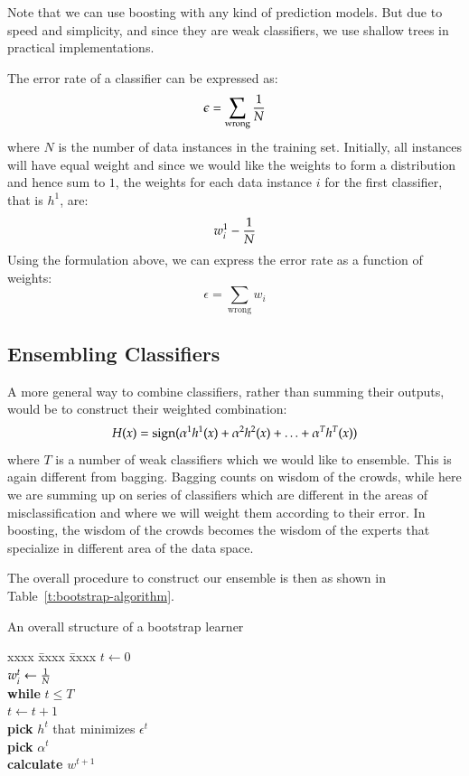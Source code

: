 \begin{refsection}
Note that we can use boosting with any kind of prediction models. But due to speed and simplicity, and since they are weak classifiers, we use shallow trees in practical implementations.

The error rate of a classifier can be expressed as:
$$\epsilon = \sum_\text{wrong}{1\over N}$$
where $N$ is the number of data instances in the training set. Initially, all instances will have equal weight and since we would like the weights to form a distribution and hence sum to $1$, the weights for each data instance $i$ for the first classifier, that is $h^1$, are:
$$w_i^1 - {1\over N}$$
Using the formulation above, we can express the error rate as a function of weights:
$$\epsilon = \sum_{\text{wrong}} w_i$$

\subsection*{Ensembling Classifiers}

A more general way to combine classifiers, rather than summing their outputs, would be to construct their weighted combination:
$$ H(x) = \text{sign}(\alpha^1 h^1(x) + \alpha^2 h^2(x) + \ldots + \alpha^T h^T(x)) $$
where $T$ is a number of weak classifiers which we would like to ensemble. This is again different from bagging. Bagging counts on wisdom of the crowds, while here we are summing up on series of classifiers which are different in the areas of misclassification and where we will weight them according to their error. In boosting, the wisdom of the crowds becomes the wisdom of the experts that specialize in different area of the data space.

The overall procedure to construct our ensemble is then as shown in Table~\ref{t:bootstrap-algorithm}.

\begin{table}
\caption{An overall structure of a bootstrap learner}
\begin{tabbing}
xxxx \= xxxx \= xxxx \kill
$t\leftarrow 0$ \\
$w_i^t\leftarrow {1\over N}$ \\
{\bf while} $t\leq T$ \\
\> $t\leftarrow t+1$ \\
\> {\bf pick} $h^t$ that minimizes $\epsilon^t$ \\
\> {\bf pick} $\alpha^t$ \\
\> {\bf calculate} $w^{t+1}$
\end{tabbing}
\label{t:bootstrap-algorithm}
\end{table}


\end{refsection}
